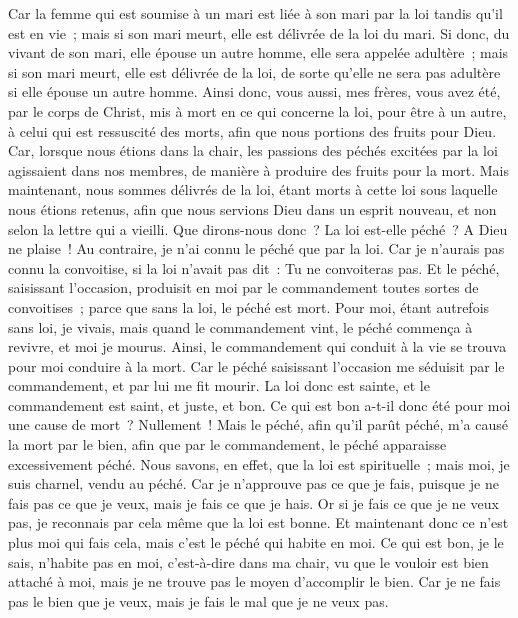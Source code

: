 \begin{multicols}{2}
Car la femme qui est soumise à un mari est liée à son mari par la loi tandis qu'il est en vie~; mais si son mari meurt, elle est délivrée de la loi du mari.
Si donc, du vivant de son mari, elle épouse un autre homme, elle sera appelée adultère~; mais si son mari meurt, elle est délivrée de la loi, de sorte qu'elle ne sera pas adultère si elle épouse un autre homme.
Ainsi donc, vous aussi, mes frères, vous avez été, par le corps de Christ, mis à mort en ce qui concerne la loi, pour être à un autre, à celui qui est ressuscité des morts, afin que nous portions des fruits pour Dieu.
Car, lorsque nous étions dans la chair, les passions des péchés excitées par la loi agissaient dans nos membres, de manière à produire des fruits pour la mort.
Mais maintenant, nous sommes délivrés de la loi, étant morts à cette loi sous laquelle nous étions retenus, afin que nous servions Dieu dans un esprit nouveau, et non selon la lettre qui a vieilli.
Que dirons-nous donc~? La loi est-elle péché~? A Dieu ne plaise~! Au contraire, je n'ai connu le péché que par la loi. Car je n'aurais pas connu la convoitise, si la loi n'avait pas dit~: Tu ne convoiteras pas.
Et le péché, saisissant l'occasion, produisit en moi par le commandement toutes sortes de convoitises~; parce que sans la loi, le péché est mort.
Pour moi, étant autrefois sans loi, je vivais, mais quand le commandement vint, le péché commença à revivre, et moi je mourus.
Ainsi, le commandement qui conduit à la vie se trouva pour moi conduire à la mort.
Car le péché saisissant l'occasion me séduisit par le commandement, et par lui me fit mourir.
La loi donc est sainte, et le commandement est saint, et juste, et bon.
Ce qui est bon a-t-il donc été pour moi une cause de mort~? Nullement~! Mais le péché, afin qu'il parût péché, m'a causé la mort par le bien, afin que par le commandement, le péché apparaisse excessivement péché.
Nous savons, en effet, que la loi est spirituelle~; mais moi, je suis charnel, vendu au péché.
Car je n'approuve pas ce que je fais, puisque je ne fais pas ce que je veux, mais je fais ce que je hais.
Or si je fais ce que je ne veux pas, je reconnais par cela même que la loi est bonne.
Et maintenant donc ce n'est plus moi qui fais cela, mais c'est le péché qui habite en moi.
Ce qui est bon, je le sais, n'habite pas en moi, c'est-à-dire dans ma chair, vu que le vouloir est bien attaché à moi, mais je ne trouve pas le moyen d'accomplir le bien.
Car je ne fais pas le bien que je veux, mais je fais le mal que je ne veux pas.

\end{multicols}
